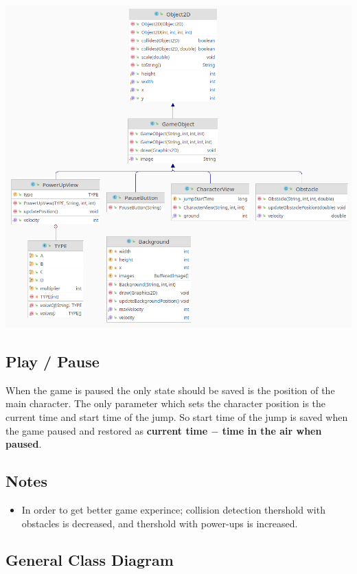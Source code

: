 \documentclass[a4paper]{article}
\begin{document}
\begin{center}
\includegraphics[width=.9\linewidth]{org-img/Design_Explanation/2021-10-28_02-11-11_screenshot.png}
\end{center}

\subsection*{Play / Pause}
\label{sec:orge6a0e1a}

When the game is paused the only state should be saved is the position of the main character.
The only parameter which sets the character position is the current time and start time of the jump.
So start time of the jump is saved when the game paused and restored as \textbf{current time \(-\) time in the air when paused}.

\subsection*{Notes}
\label{sec:org61ee81d}

\begin{itemize}
\item In order to get better game experince; collision detection thershold with obstacles is decreased, and thershold with power-ups is increased.
\end{itemize}


\newpage
\subsection*{General Class Diagram}
\label{sec:orge1ffedc}
\end{document}
